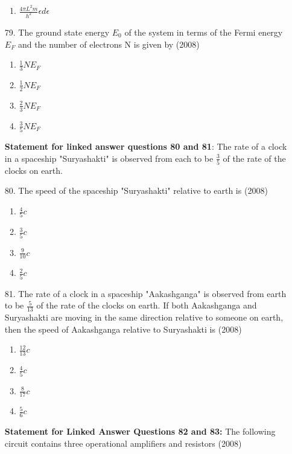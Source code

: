 \documentclass[journal]{IEEEtran}
\begin{document}
\begin{enumerate}
\begin{enumerate}[label=(\Alph*)]
        \item  $\frac{4\pi L^2 m}{h^2}\epsilon d\epsilon$
    \end{enumerate}
    \item[79.]  The ground state energy $E_0$ of the system in terms of the Fermi energy $E_F$ and the number of electrons N is given by \hfill (2008)
    \begin{enumerate}[label=(\Alph*)]
        \item $\frac{1}{3}NE_F$
        \item $\frac{1}{2}NE_F$
        \item $\frac{2}{3}NE_F$
        \item $\frac{3}{5}NE_F$
    \end{enumerate}
    \textbf{Statement for linked answer questions 80 and 81}:
    The rate of a clock in a spaceship "Suryashakti" is observed from each to be $\frac{3}{5}$ of the rate of the clocks on earth.
    \item[80.]  The speed of the spaceship "Suryashakti" relative to earth is \hfill (2008)
    \begin{enumerate}[label=(\Alph*)]
        \item $\frac{4}{5}c$
        \item $\frac{3}{5}c$
        \item $\frac{9}{10}c$
        \item $\frac{2}{5}c$
    \end{enumerate}
    \item[81.] The rate of a clock in a spaceship "Aakashganga" is observed from earth to be $\frac{5}{13}$ of the rate of the clocks on earth. If both Aakashganga and Suryashakti are moving in the same direction relative to someone on earth, then the speed of Aakashganga relative to Suryashakti is \hfill (2008)
    \begin{enumerate}[label=(\Alph*)]
        \item $\frac{12}{13}c$
        \item $\frac{4}{5}c$
        \item $\frac{8}{17}c$
        \item $\frac{5}{6}c$
    \end{enumerate}
    \textbf{Statement for Linked Answer Questions 82 and 83:}
    The following circuit contains three operational amplifiers and resistors \hfill (2008)
    \begin{figure}[!ht]
      \centering
      \resizebox{0.6\textwidth}{!}{%
    \begin{circuitikz}

\end{circuitikz}}
\end{figure}
\end{enumerate}
\end{document}

